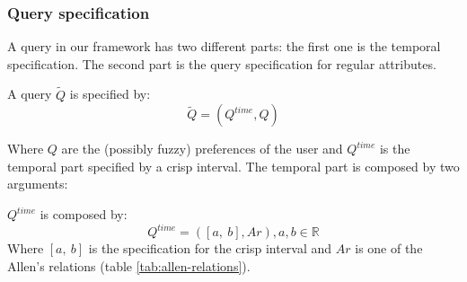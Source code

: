 \subsubsection{Query specification}
A query in our framework has two different parts: the first one is the temporal specification. The second part is the query specification for regular attributes.

\begin{definition}
A query $\tilde Q$ is specified by:
\begin{equation}
\label{eq:query-definition}
\tilde Q = \left( Q^{time}, Q \right)
\end{equation}
\end{definition}
Where $Q$ are the (possibly fuzzy) preferences of the user  and $Q^{time}$ is the temporal part specified by a crisp interval. The temporal part is composed by two arguments:

\begin{definition}
 $Q^{time}$ is composed by:
\begin{equation}
Q^{time} = \left( \left[a, \ b \right] , Ar \right), a,b \in \mathbb{R}
\end{equation}
Where $ \left[a, \ b \right] $ is the specification for the crisp interval and $Ar$ is one of the Allen's relations (table \ref{tab:allen-relations}).
\end{definition}

